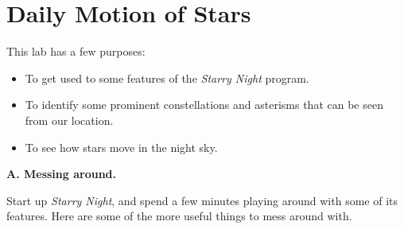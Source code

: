 \chapter{Daily Motion of Stars}

This lab has a few purposes:
\begin{itemize}
\item To get used to some features of the {\it Starry Night}
program.
\item To identify some prominent constellations and asterisms
that can be seen from our location.
\item To see how stars move in the night sky.
\end{itemize}

\bigskip

{\bf A. Messing around.}

Start up {\it Starry Night}, and spend a few minutes playing around with
some of its features.  Here are some of the more useful things
to mess around with.  

